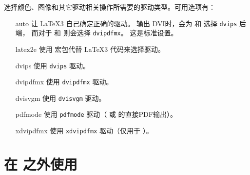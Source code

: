 \documentclass{l3doc}
\begin{document}
%
选择颜色、图像和其它驱动相关操作所需要的驱动类型。可用选项有：
\begin{itemize}[font = \texttt]
    \item[auto] 让 \LaTeX3 自己确定正确的驱动。
    输出 DVI时，会为 \pdfTeX{} 和 \LuaTeX{} 选择 \texttt{dvips} 后端，
    而对于 \pTeX{} 和 \upTeX{} 则会选择 \texttt{dvipdfmx}。
    这是标准设置。
    \item[latex2e] 使用  宏包代替 \LaTeX3 代码来选择驱动。
    \item[dvips] 使用 \texttt{dvips} 驱动。
    \item[dvipdfmx] 使用 \texttt{dvipdfmx} 驱动。
    \item[dvisvgm] 使用 \texttt{dvisvgm} 驱动。
    \item[pdfmode] 使用 \texttt{pdfmode} 驱动（\pdfTeX{} 或 \LuaTeX{} 的直接PDF输出）。
    \item[xdvipdfmx] 使用 \texttt{xdvipdfmx} 驱动（仅用于 \XeTeX{}）。
\end{itemize}

%
\section{在 \LaTeXe{} 之外使用 }
\end{document}
